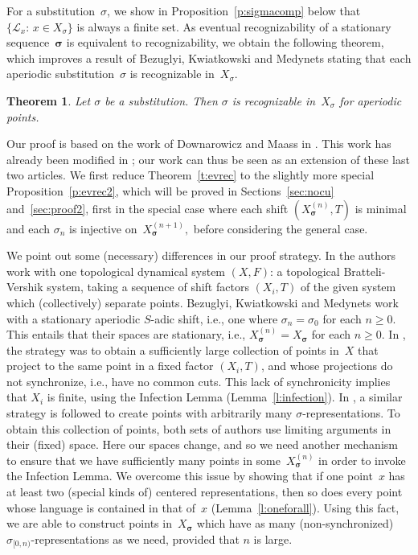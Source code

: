 \documentclass{amsart}
\newtheorem{theorem}[lemma]{Theorem}
\theoremstyle{definition}
\theoremstyle{remark}
\numberwithin{equation}{section}
\begin{document}
For a substitution~$\sigma$, we show in Proposition~\ref{p:sigmacomp} below that $\{\mathcal{L}_x:\, x \in X_\sigma\}$ is always a finite set.
As eventual recognizability of a stationary sequence~$\boldsymbol{\sigma}$ is equivalent to recognizability, we obtain the following theorem, which improves a result of Bezuglyi, Kwiatkowski and Medynets \cite[Theorem~5.17]{Bezugly:2009} stating that each aperiodic substitution~$\sigma$ is recognizable in~$X_\sigma$.

\begin{theorem} \label{t:substrec}
Let $\sigma$ be a substitution. 
Then $\sigma$ is recognizable in~$X_\sigma$ for aperiodic points. 
\end{theorem}

Our proof is based on the work of Downarowicz and Maass in \cite{Down:2008}. 
This work has already been modified in \cite{Bezugly:2009}; our work can thus be seen as an extension of these last two articles. 
We first reduce Theorem~\ref{t:evrec} to the slightly more special Proposition~\ref{p:evrec2}, which will be proved in Sections~\ref{sec:nocu} and~\ref{sec:proof2}, first in the special case where each shift $(X_{\boldsymbol{\sigma}}^{(n)},T)$ is minimal and each $\sigma_n$ is injective on~$X_{\boldsymbol{\sigma}}^{(n+1)},$ before considering the general case. 

We point out some (necessary) differences in our proof strategy. 
In \cite{Down:2008} the authors work with one topological dynamical system $(X,F)$: a topological Bratteli-Vershik system, taking a sequence of shift factors $(X_i,T)$ of the given system which (collectively) separate points. 
Bezuglyi, Kwiatkowski and Medynets work with a stationary aperiodic $S$-adic shift, i.e., one where $\sigma_n= \sigma_0$ for each $n\geq 0$. 
This entails that their spaces are stationary, i.e., $X_{\boldsymbol{\sigma}}^{(n)} = X_{\boldsymbol{\sigma}}$ for each $n\geq 0$. 
In \cite{Down:2008}, the strategy was to obtain a sufficiently large collection of points in~$X$ that project to the same point in a fixed factor $(X_i,T)$, and whose projections do not synchronize, i.e., have no common cuts. 
This lack of synchronicity implies that $X_i$ is finite, using the Infection Lemma (Lemma~\ref{l:infection}).
In \cite{Bezugly:2009}, a similar strategy is followed to create points with arbitrarily many $\sigma$-representations.
To obtain this collection of points, both sets of authors use limiting arguments in their (fixed) space.
Here our spaces change, and so we need another mechanism to ensure that we have sufficiently many points in some~$X_{\boldsymbol{\sigma}}^{(n)}$ in order to invoke the Infection Lemma. 
We overcome this issue by showing that if one point~$x$ has at least two (special kinds of) centered representations, then so does every point whose language is contained in that of~$x$ (Lemma~\ref{l:oneforall}). 
Using this fact, we are able to construct points in~$X_{\boldsymbol{\sigma}}$ which have as many  (non-synchronized) $\sigma_{[0,n)}$-representations as we need, provided that $n$ is large. 
\end{document}
